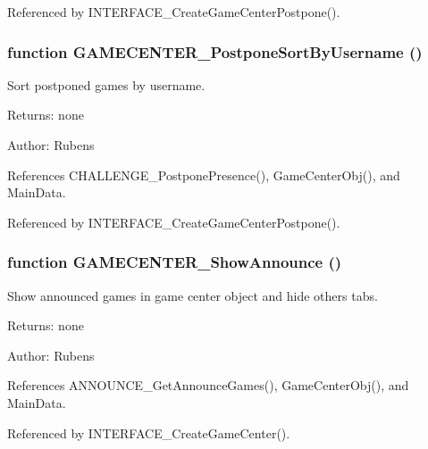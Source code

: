 Referenced by INTERFACE\_\-CreateGameCenterPostpone().
\subsubsection[GAMECENTER\_\-PostponeSortByUsername]{\setlength{\rightskip}{0pt plus 5cm}function GAMECENTER\_\-PostponeSortByUsername ()}\label{gamecenter_2gamecenter_8js_6bbde14b6aff81e46967080a21d7e0d2}


Sort postponed games by username. 

\begin{Desc}
\item[Returns:]none \end{Desc}
\begin{Desc}
\item[Author:]Rubens \end{Desc}


References CHALLENGE\_\-PostponePresence(), GameCenterObj(), and MainData.

Referenced by INTERFACE\_\-CreateGameCenterPostpone().
\subsubsection[GAMECENTER\_\-ShowAnnounce]{\setlength{\rightskip}{0pt plus 5cm}function GAMECENTER\_\-ShowAnnounce ()}\label{gamecenter_2gamecenter_8js_c22c65ed3dfc994e2de0344e8fac669f}


Show announced games in game center object and hide others tabs. 

\begin{Desc}
\item[Returns:]none \end{Desc}
\begin{Desc}
\item[Author:]Rubens \end{Desc}


References ANNOUNCE\_\-GetAnnounceGames(), GameCenterObj(), and MainData.

Referenced by INTERFACE\_\-CreateGameCenter().
